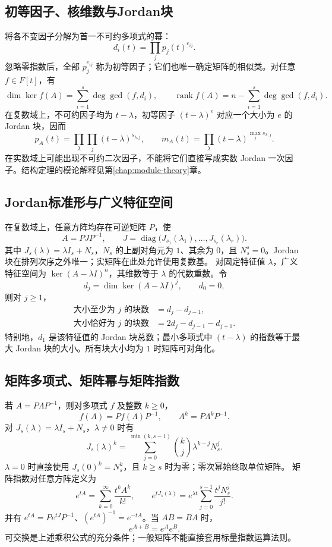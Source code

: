\documentclass[../main.tex]{subfiles}
\begin{document}
\subsection{初等因子、核维数与Jordan块}
将各不变因子分解为首一不可约多项式的幂：
\[
d_i(t)=\prod_j p_j(t)^{e_{ij}}.
\]
忽略零指数后，全部 $p_j^{e_{ij}}$ 称为初等因子；它们也唯一确定矩阵的相似类。对任意 $f\in F[t]$，有
\[
\dim\ker f(A)=\sum_{i=1}^s\deg\gcd(f,d_i),\qquad
\operatorname{rank}f(A)=n-\sum_{i=1}^s\deg\gcd(f,d_i).
\]
在复数域上，不可约因子均为 $t-\lambda$，初等因子 $(t-\lambda)^e$ 对应一个大小为 $e$ 的 Jordan 块，因而
\[
p_A(t)=\prod_{\lambda}\prod_j(t-\lambda)^{s_{\lambda,j}},\qquad
m_A(t)=\prod_{\lambda}(t-\lambda)^{\max_j s_{\lambda,j}}.
\]
在实数域上可能出现不可约二次因子，不能将它们直接写成实数 Jordan 一次因子。结构定理的模论解释见第\ref{chap:module-theory}章。
\subsection{Jordan标准形与广义特征空间}
在复数域上，任意方阵均存在可逆矩阵 $P$，使
\[
A=PJP^{-1},\qquad
J=\operatorname{diag}\bigl(J_{s_1}(\lambda_1),\ldots,J_{s_r}(\lambda_r)\bigr).
\]
其中 $J_s(\lambda)=\lambda I_s+N_s$，$N_s$ 的上副对角元为 $1$、其余为 $0$，且 $N_s^s=0$。Jordan 块在排列次序之外唯一；实矩阵在此处允许使用复数基。
对固定特征值 $\lambda$，广义特征空间为 $\ker(A-\lambda I)^n$，其维数等于 $\lambda$ 的代数重数。令
\[
d_j=\dim\ker(A-\lambda I)^j,\qquad d_0=0,
\]
则对 $j\ge1$，
\begin{align*}
\text{大小至少为 }j\text{ 的块数}&=d_j-d_{j-1},\\
\text{大小恰好为 }j\text{ 的块数}&=2d_j-d_{j-1}-d_{j+1}.
\end{align*}
特别地，$d_1$ 是该特征值的 Jordan 块总数；最小多项式中 $(t-\lambda)$ 的指数等于最大 Jordan 块的大小。所有块大小均为 $1$ 时矩阵可对角化。
\subsection{矩阵多项式、矩阵幂与矩阵指数}
若 $A=P\Lambda P^{-1}$，则对多项式 $f$ 及整数 $k\ge0$，
\[
f(A)=Pf(\Lambda)P^{-1},\qquad A^k=P\Lambda^kP^{-1}.
\]
对 $J_s(\lambda)=\lambda I_s+N_s$，$\lambda\ne0$ 时有
\[
J_s(\lambda)^k=
\sum_{j=0}^{\min(k,s-1)}\binom kj\lambda^{k-j}N_s^j.
\]
$\lambda=0$ 时直接使用 $J_s(0)^k=N_s^k$，且 $k\ge s$ 时为零；零次幂始终取单位矩阵。
矩阵指数对任意方阵定义为
\[
e^{tA}=\sum_{k=0}^\infty\frac{t^kA^k}{k!},\qquad
e^{tJ_s(\lambda)}=e^{\lambda t}\sum_{j=0}^{s-1}\frac{t^jN_s^j}{j!}.
\]
并有 $e^{tA}=Pe^{tJ}P^{-1}$、$(e^{tA})^{-1}=e^{-tA}$。当 $AB=BA$ 时，
\[
e^{A+B}=e^Ae^B.
\]
可交换是上述乘积公式的充分条件；一般矩阵不能直接套用标量指数运算法则。
\end{document}
